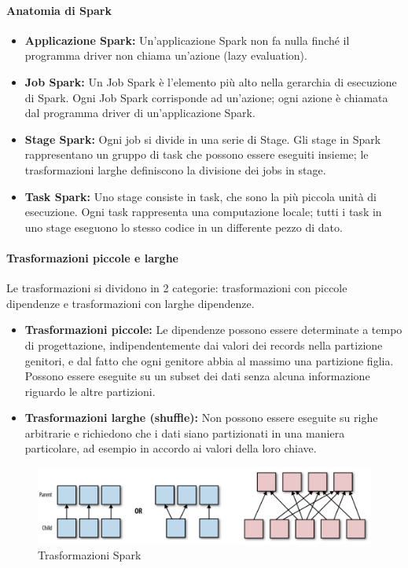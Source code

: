\documentclass{article}
\begin{document}
\begin{appendices}
\paragraph{Anatomia di Spark}
\begin{itemize}
    \item \textbf{Applicazione Spark:} Un'applicazione Spark non fa nulla finché il programma driver non chiama un'azione (lazy evaluation).
    \item \textbf{Job Spark:} Un Job Spark è l'elemento più alto nella gerarchia di esecuzione di Spark. Ogni Job Spark corrisponde ad un'azione; ogni azione è chiamata dal programma driver di un'applicazione Spark.
    \item \textbf{Stage Spark:} Ogni job si divide in una serie di Stage. Gli stage in Spark rappresentano un gruppo di task che possono essere eseguiti insieme; le trasformazioni larghe definiscono la divisione dei jobs in stage.
    \item \textbf{Task Spark:} Uno stage consiste in task, che sono la più piccola unità di esecuzione. Ogni task rappresenta una computazione locale; tutti i task in uno stage eseguono lo stesso codice in un differente pezzo di dato.
\end{itemize}

\paragraph{Trasformazioni piccole e larghe}
Le trasformazioni si dividono in 2 categorie: trasformazioni con piccole dipendenze e trasformazioni con larghe dipendenze.
\begin{itemize}
    \item \textbf{Trasformazioni piccole:} Le dipendenze possono essere determinate a tempo di progettazione, indipendentemente dai valori dei records nella partizione genitori, e dal fatto che ogni genitore abbia al massimo una partizione figlia. \\
    Possono essere eseguite su un subset dei dati senza alcuna informazione riguardo le altre partizioni.
    \item \textbf{Trasformazioni larghe (shuffle):} Non possono essere eseguite su righe arbitrarie e richiedono che i dati siano partizionati in una maniera particolare, ad esempio in accordo ai valori della loro chiave.
\end{itemize}

\begin{figure}[H]
    \centering
    \includegraphics[scale=0.3]{img/spark trasformazioni.png}
    \caption{Trasformazioni Spark}
\end{figure}\noindent


\end{appendices}
\end{document}
